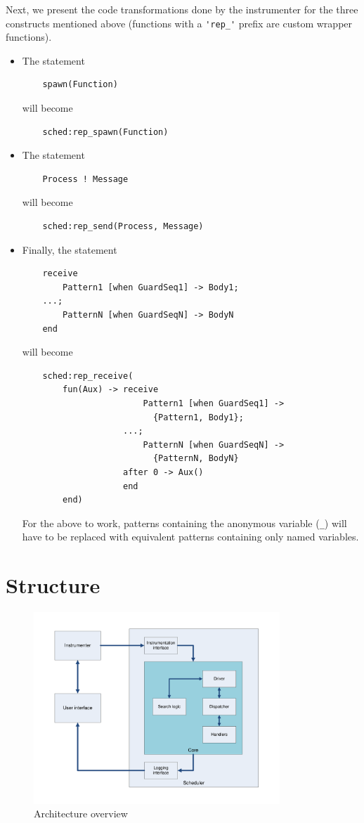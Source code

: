\documentclass[a4paper,10pt]{article}
\begin{document}
Next, we present the code transformations done by the instrumenter for the three constructs mentioned above
(functions with a \lstinline+'rep_'+ prefix are custom wrapper functions).

\begin{itemize}
	\item The statement
	\begin{lstlisting}
    spawn(Function)
	\end{lstlisting}
	will become
	\begin{lstlisting}
    sched:rep_spawn(Function)
	\end{lstlisting}
	
	\item The statement
	\begin{lstlisting}
    Process ! Message
	\end{lstlisting}
	will become
	\begin{lstlisting}
    sched:rep_send(Process, Message)
	\end{lstlisting}
	
	\item Finally, the statement
	\begin{lstlisting}
    receive
        Pattern1 [when GuardSeq1] -> Body1;
    ...;
        PatternN [when GuardSeqN] -> BodyN
    end
	\end{lstlisting}
	will become
	\begin{lstlisting}
    sched:rep_receive(
        fun(Aux) -> receive
                        Pattern1 [when GuardSeq1] ->
                          {Pattern1, Body1};
                    ...;
                        PatternN [when GuardSeqN] ->
                          {PatternN, BodyN}
                    after 0 -> Aux()
                    end
        end)
	\end{lstlisting}
	For the above to work, patterns containing the anonymous variable (\lstinline+_+) will have to
	be replaced with equivalent patterns containing only named variables.
\end{itemize}

\section{Structure}

\begin{center}
\begin{figure}[htb]
	\includegraphics[width=350px]{pra1_arch}
	\caption{Architecture overview}
\end{figure}
\end{center}
\end{document}

